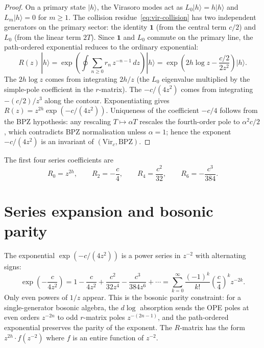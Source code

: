 \documentclass[11pt]{article}
\theoremstyle{definition}
\theoremstyle{remark}
\newcommand{\Vir}{\mathrm{Vir}}
\numberwithin{equation}{section}
\begin{document}
\begin{proof}
On a primary state $|h\rangle$, the Virasoro modes act as
$L_0|h\rangle = h|h\rangle$ and $L_m|h\rangle = 0$ for $m \geq 1$.
The collision residue~\eqref{eq:vir-collision} has two independent
generators on the primary sector: the identity $\mathbf{1}$
(from the central term $c/2$) and $L_0$ (from the linear term $2T$).
Since $\mathbf{1}$ and $L_0$ commute on the primary line, the
path-ordered exponential reduces to the ordinary exponential:
\begin{equation}\label{eq:pexp}
R(z)\,|h\rangle
= \exp\!\left(\oint \sum_{n \geq 0} r_n\,z^{-n-1}\,dz\right)
|h\rangle
= \exp\!\left(2h\log z - \frac{c/2}{2z^2}\right)|h\rangle.
\end{equation}
The $2h\log z$ comes from integrating $2h/z$ (the $L_0$ eigenvalue
multiplied by the simple-pole coefficient in the $r$-matrix).
The $-c/(4z^2)$ comes from integrating $-(c/2)/z^3$ along the
contour. Exponentiating gives
$R(z) = z^{2h}\exp(-c/(4z^2))$. Uniqueness of the coefficient
$-c/4$ follows from the BPZ hypothesis: any rescaling $T \mapsto
\alpha T$ rescales the fourth-order pole to $\alpha^2 c/2$, which
contradicts BPZ normalisation unless $\alpha = 1$; hence the exponent
$-c/(4z^2)$ is an invariant of $(\Vir_c, \text{BPZ})$.
\end{proof}

The first four series coefficients are
\begin{equation}\label{eq:R-coeffs}
R_0 = z^{2h}, \qquad
R_2 = -\frac{c}{4}, \qquad
R_4 = \frac{c^2}{32}, \qquad
R_6 = -\frac{c^3}{384}.
\end{equation}

\section{Series expansion and bosonic parity}\label{sec:parity}

The exponential $\exp(-c/(4z^2))$ is a power series in $z^{-2}$
with alternating signs:
\begin{equation}\label{eq:exp-series}
\exp\!\left(-\frac{c}{4z^2}\right)
= 1 - \frac{c}{4z^2} + \frac{c^2}{32z^4}
- \frac{c^3}{384z^6} + \cdots
= \sum_{k=0}^{\infty} \frac{(-1)^k}{k!}
\left(\frac{c}{4}\right)^k z^{-2k}.
\end{equation}
Only even powers of $1/z$ appear. This is the bosonic parity
constraint: for a single-generator bosonic algebra, the $d\log$
absorption sends the OPE poles at even orders $z^{-2n}$ to odd
$r$-matrix poles $z^{-(2n-1)}$, and the path-ordered exponential
preserves the parity of the exponent. The $R$-matrix has the form
$z^{2h} \cdot f(z^{-2})$ where $f$ is an entire function of $z^{-2}$.
\end{document}
